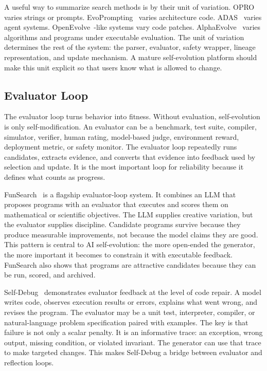 A useful way to summarize search methods is by their unit of variation.  OPRO~\cite{opro2023} varies strings or prompts.  EvoPrompting~\cite{evoprompting2023} varies architecture code.  ADAS~\cite{adas2025} varies agent systems.  OpenEvolve~\cite{openevolve2024}-like systems vary code patches.  AlphaEvolve~\cite{alphaevolve2025} varies algorithms and programs under executable evaluation.  The unit of variation determines the rest of the system: the parser, evaluator, safety wrapper, lineage representation, and update mechanism.  A mature self-evolution platform should make this unit explicit so that users know what is allowed to change.

\subsection{Evaluator Loop}
\label{subsec:taxonomy-evaluator}

The evaluator loop turns behavior into fitness.  Without evaluation, self-evolution is only self-modification.  An evaluator can be a benchmark, test suite, compiler, simulator, verifier, human rating, model-based judge, environment reward, deployment metric, or safety monitor.  The evaluator loop repeatedly runs candidates, extracts evidence, and converts that evidence into feedback used by selection and update.  It is the most important loop for reliability because it defines what counts as progress.

FunSearch~\cite{funsearch2024} is a flagship evaluator-loop system.  It combines an LLM that proposes programs with an evaluator that executes and scores them on mathematical or scientific objectives.  The LLM supplies creative variation, but the evaluator supplies discipline.  Candidate programs survive because they produce measurable improvements, not because the model claims they are good.  This pattern is central to AI self-evolution: the more open-ended the generator, the more important it becomes to constrain it with executable feedback.  FunSearch also shows that programs are attractive candidates because they can be run, scored, and archived.

Self-Debug~\cite{singh2023selfdebug} demonstrates evaluator feedback at the level of code repair.  A model writes code, observes execution results or errors, explains what went wrong, and revises the program.  The evaluator may be a unit test, interpreter, compiler, or natural-language problem specification paired with examples.  The key is that failure is not only a scalar penalty.  It is an informative trace: an exception, wrong output, missing condition, or violated invariant.  The generator can use that trace to make targeted changes.  This makes Self-Debug a bridge between evaluator and reflection loops.

